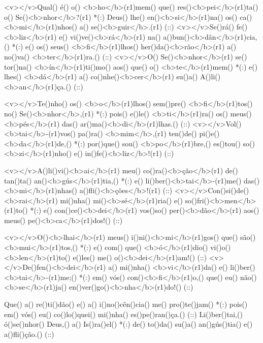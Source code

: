 <v></v>Qual() é() o() <b>ho</b>(r1)mem() que() res()<b>pei</b>(r1)ta() o() Se()<b>nhor</b>?(r1) *(:)
Deus() lhe() en()<b>si</b>(r1)na() os() ca()<b>mi</b>(r1)nhos() a() se()<b>guir</b>.(r1) (::)
<v></v>Se()rá() fe()<b>liz</b>(r1) e() vi()ve()<b>rá</b>(r1) na() a()bun()<b>dân</b>(r1)cia,() *(:)
e() os() seus() <b>fi</b>(r1)lhos() her()da()<b>rão</b>(r1) a() no()va() <b>ter</b>(r1)ra.() (::)
<v></v>O() Se()<b>nhor</b>(r1) se() tor()na() <b>ín</b>(r1)ti()mo() aos() que() o() <b>te</b>(r1)mem() *(:)
e() lhes() <b>dá</b>(r1) a() co()nhe()<b>cer</b>(r1) su()a() A()li()<b>an</b>(r1)ça.() (::)

<v></v>Te()nho() os() <b>o</b>(r1)lhos() sem()pre() <b>fi</b>(r1)tos() no() Se()<b>nhor</b>,(r1) *(:)
pois() e()le() <b>ti</b>(r1)ra() os() meus() <b>pés</b>(r1) das() ar()ma()<b>di</b>(r1)lhas.() (::)
<v></v>Vol()<b>tai</b>-(r1)vos() pa()ra() <b>mim</b>,(r1) ten()de() pi()e()<b>da</b>(r1)de,() *(:)
por()que() sou() <b>po</b>(r1)bre,() es()tou() so()<b>zi</b>(r1)nho() e() in()fe()<b>liz</b>!(r1) (::)


<v></v>A()li()vi()<b>ai</b>(r1) meu() co()ra()<b>ção</b>(r1) de() tan()ta() an()<b>gús</b>(r1)tia,() *(:)
e() li()ber()<b>tai</b>-(r1)me() das() <b>mi</b>(r1)nhas() a()fli()<b>ções</b>!(r1) (::)
<v></v>Con()si()de()<b>rai</b>(r1) mi()nha() mi()<b>sé</b>(r1)ria() e() so()fri()<b>men</b>(r1)to() *(:)
e() con()ce()<b>dei</b>(r1) vos()so() per()<b>dão</b>(r1) aos() meus() pe()<b>ca</b>(r1)dos!() (::)

<v></v>O()<b>lhai</b>(r1) meus() i()ni()<b>mi</b>(r1)gos() que() são() <b>mui</b>(r1)tos,() *(:)
e() com() que() <b>ó</b>(r1)dio() vi()o()<b>len</b>(r1)to() e()les() me() o()<b>dei</b>(r1)am!() (::)
<v></v>De()fen()<b>dei</b>(r1) a() mi()nha() <b>vi</b>(r1)da() e() li()ber()<b>tai</b>-(r1)me;() *(:)
em() vós() con()<b>fi</b>(r1)o,() que() eu() não() <b>se</b>(r1)ja() en()ver()go()<b>nha</b>(r1)do!() (::)

Que() a() re()ti()dão() e() a() i()no()cên()cia() me() pro()te()jam() *(:)
pois() em() vós() eu() co()lo()quei() mi()nha() es()pe()ran()ça.() (::)
Li()ber()tai,() ó()se()nhor() Deus,() a() Is()ra()el() *(:)
de() to()da() su()a() an()gús()tia() e() a()fli()ção.() (::)